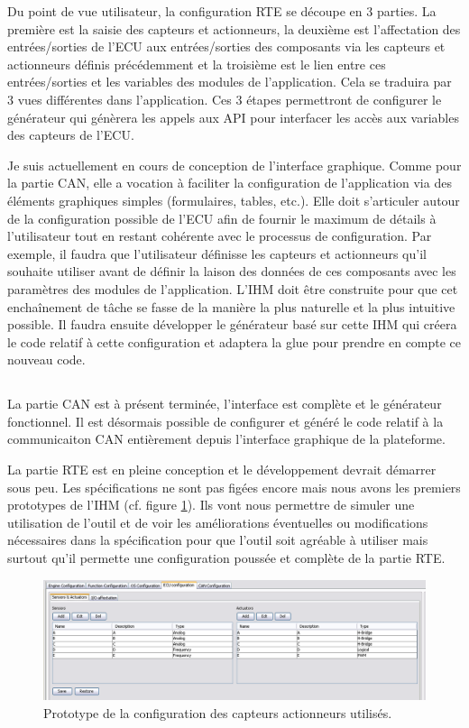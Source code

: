 Du point de vue utilisateur, la configuration RTE se découpe en 3 parties. La
première est la saisie des capteurs et actionneurs, la deuxième est
l'affectation des entrées/sorties de l'ECU aux entrées/sorties des composants
via les capteurs et actionneurs définis précédemment et la troisième est le lien
entre ces entrées/sorties et les variables des modules de l'application. Cela se
traduira par 3 vues différentes dans l'application. Ces 3 étapes permettront de
configurer le générateur qui génèrera les appels aux API pour interfacer les
accès aux variables des capteurs de l'ECU.

Je suis actuellement en cours de conception de l'interface graphique. Comme pour
la partie CAN, elle a vocation à faciliter la configuration de l'application via
des éléments graphiques simples (formulaires, tables, etc.). 
Elle doit s'articuler autour de la configuration possible de l'ECU afin de
fournir le maximum de détails à l'utilisateur tout en restant cohérente avec le
processus de configuration. Par exemple, il faudra que l'utilisateur définisse
les capteurs et actionneurs qu'il souhaite utiliser avant de définir la laison
des données de ces composants avec les paramètres des modules de l'application.
L'IHM doit être construite pour que cet enchaînement de tâche se fasse de la
manière la plus naturelle et la plus intuitive possible.  Il faudra ensuite
développer le générateur basé sur cette IHM qui créera le code relatif à cette
configuration et adaptera la \og glue \fg{} pour prendre en compte ce nouveau
code.


\subsection*{}
La partie CAN est à présent terminée, l'interface est complète et le générateur
fonctionnel. Il est désormais possible de configurer et généré le code relatif à
la communicaiton CAN entièrement depuis l'interface graphique de la plateforme.

La partie RTE est en pleine conception et le développement devrait démarrer
sous peu. Les spécifications ne sont pas figées
encore mais nous avons les premiers prototypes de l'IHM (cf. figure
\ref{fig:rte_conf}). Ils vont nous permettre
de simuler une utilisation de l'outil et de voir les améliorations éventuelles
ou modifications nécessaires dans la spécification pour que l'outil soit agréable
à utiliser mais surtout qu'il permette une configuration poussée et complète de
la partie RTE.

\begin{figure}[h]
  \centering
  \includegraphics[scale=0.45]{images/rte_conf}
  \caption{Prototype de la configuration des capteurs actionneurs utilisés.}
  \label{fig:rte_conf}
\end{figure}



